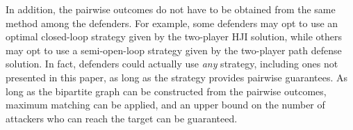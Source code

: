 In addition, the pairwise outcomes do not have to be obtained from the same method among the defenders. For example, some defenders may opt to use an optimal closed-loop strategy given by the two-player HJI solution, while others may opt to use a semi-open-loop strategy given by the two-player path defense solution. In fact, defenders could actually use \textit{any} strategy, including ones not presented in this paper, as long as the strategy provides pairwise guarantees. As long as the bipartite graph can be constructed from the pairwise outcomes, maximum matching can be applied, and an upper bound on the number of attackers who can reach the target can be guaranteed.